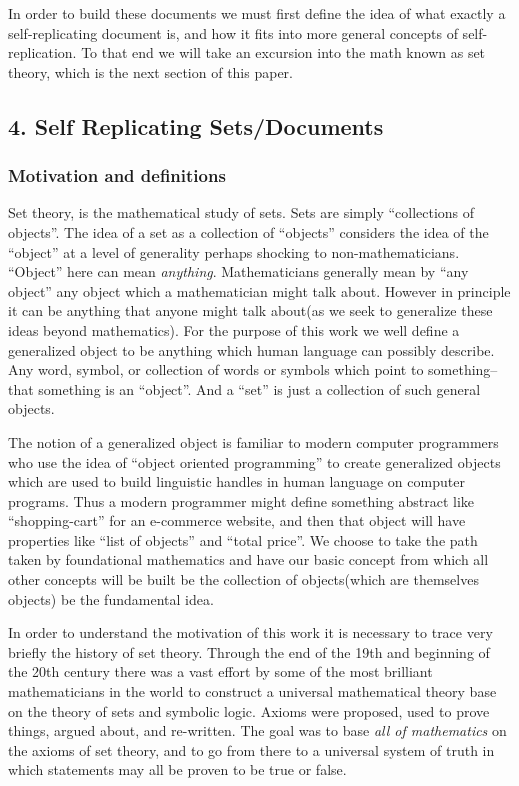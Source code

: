 In order to build these documents we must first define the idea of what
exactly a self-replicating document is, and how it fits into more
general concepts of self-replication. To that end we will take an
excursion into the math known as set theory, which is the next section
of this paper.

\subsection{4. Self Replicating
Sets/Documents}\label{self-replicating-setsdocuments}

\subsubsection{Motivation and
definitions}\label{motivation-and-definitions}

Set theory, is the mathematical study of sets. Sets are simply
``collections of objects''. The idea of a set as a collection of
``objects'' considers the idea of the ``object'' at a level of
generality perhaps shocking to non-mathematicians. ``Object'' here can
mean \emph{anything}. Mathematicians generally mean by ``any object''
any object which a mathematician might talk about. However in principle
it can be anything that anyone might talk about(as we seek to generalize
these ideas beyond mathematics). For the purpose of this work we well
define a generalized object to be anything which human language can
possibly describe. Any word, symbol, or collection of words or symbols
which point to something--that something is an ``object''. And a ``set''
is just a collection of such general objects.

The notion of a generalized object is familiar to modern computer
programmers who use the idea of ``object oriented programming'' to
create generalized objects which are used to build linguistic handles in
human language on computer programs. Thus a modern programmer might
define something abstract like ``shopping-cart'' for an e-commerce
website, and then that object will have properties like ``list of
objects'' and ``total price''. We choose to take the path taken by
foundational mathematics and have our basic concept from which all other
concepts will be built be the collection of objects(which are themselves
objects) be the fundamental idea.

In order to understand the motivation of this work it is necessary to
trace very briefly the history of set theory. Through the end of the
19th and beginning of the 20th century there was a vast effort by some
of the most brilliant mathematicians in the world to construct a
universal mathematical theory base on the theory of sets and symbolic
logic. Axioms were proposed, used to prove things, argued about, and
re-written. The goal was to base \emph{all of mathematics} on the axioms
of set theory, and to go from there to a universal system of truth in
which statements may all be proven to be true or false.


